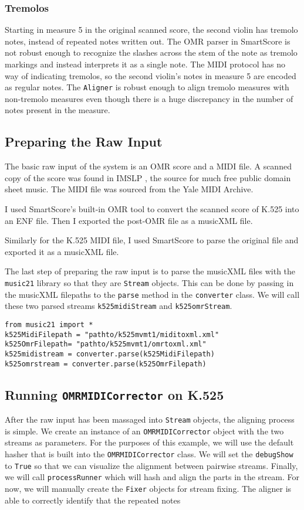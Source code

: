 \subsubsection{Tremolos}
Starting in measure 5 in the original scanned score, the second violin has tremolo notes, instead of repeated  notes written out. The OMR parser in SmartScore is not robust enough to recognize the slashes across the stem of the note as tremolo markings and instead interprets it as a single note. The MIDI protocol has no way of indicating tremolos, so the second violin's notes in measure 5 are encoded as regular  notes. The \texttt{Aligner} is robust enough to align tremolo measures with non-tremolo measures even though there is a huge discrepancy in the number of notes present in the measure.

\subsection{Preparing the Raw Input}
The basic raw input of the system is an OMR score and a MIDI file. A scanned copy of the score was found in IMSLP \cite{k525}, the source for much free public domain sheet music. The MIDI file was sourced from the Yale MIDI Archive. 

I used SmartScore's built-in OMR tool to convert the scanned score of K.525 into an ENF file. Then I exported the post-OMR file as a musicXML file.

Similarly for the K.525 MIDI file, I used SmartScore to parse the original file and exported it as a musicXML file. 

The last step of preparing the raw input is to parse the musicXML files with the \texttt{music21} library so that they are \texttt{Stream} objects. This can be done by passing in the musicXML filepaths to the \texttt{parse} method in the \texttt{converter} class. We will call these two parsed streams \texttt{k525midiStream} and \texttt{k525omrStream}. 
\begin{verbatim}
from music21 import *
k525MidiFilepath = "pathto/k525mvmt1/miditoxml.xml"
k525OmrFilepath= "pathto/k525mvmt1/omrtoxml.xml"
k525midistream = converter.parse(k525MidiFilepath)
k525omrstream = converter.parse(k525OmrFilepath)
\end{verbatim}
\subsection{Running \texttt{OMRMIDICorrector} on K.525}
After the raw input has been massaged into \texttt{Stream} objects, the aligning process is simple. We create an instance of an \texttt{OMRMIDICorrector} object with the two streams as parameters. For the purposes of this example, we will use the default hasher that is built into the \texttt{OMRMIDICorrector} class. We will set the \texttt{debugShow} to \texttt{True} so that we can visualize the alignment between pairwise streams. Finally, we will call \texttt{processRunner} which will hash and align the parts in the stream. For now, we will manually create the \texttt{Fixer} objects for stream fixing. The aligner is able to correctly identify that the repeated  notes 

